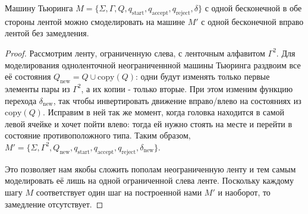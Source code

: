 


\begin{lemma} Машину Тьюринга $M = \{\Sigma, \Gamma, Q, q_{\text{start}}, q_{\text{accept}}, q_{\text{reject}}, \delta\}$ с одной бесконечной в обе стороны лентой можно смоделировать на машине $M'$ с одной бесконечной вправо лентой без замедления.
\end{lemma}

\begin{proof} Рассмотрим ленту, ограниченную слева, с ленточным алфавитом $\Gamma^2$. Для моделирования одноленточной неограниченнной машины Тьюринга  раздвоим все её состояния $Q_{\text{new}} = Q \cup \text{copy}(Q)$: одни будут изменять только первые элементы пары из $\Gamma^2$, а их копии - только вторые. При этом изменим функцию перехода $\delta_{\text{new}}$, так чтобы инвертировать движение вправо/влево на состояниях из $\text{copy}(Q)$. Исправим в ней так же момент, когда головка находится в самой левой ячейке и хочет пойти влево: тогда ей нужно стоять на месте и перейти в состояние противоположного типа. Таким образом, $M' = \{\Sigma, \Gamma^2, Q_{\text{new}}, q_{\text{start}}, q_{\text{accept}}, q_{\text{reject}}, \delta_{\text{new}}\}$.

Это позволяет нам якобы сложить пополам неограниченную ленту и тем самым моделировать её лишь на одной ограниченной слева ленте. Поскольку каждому шагу $M$ соответствует один шаг на построенной нами $M'$ и наоборот, то замедление отсутствует. \end{proof}


